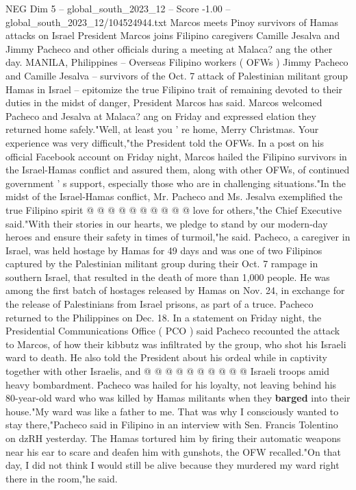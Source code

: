 \begin{textsample}{NEG Dim 5 – global\_south\_2023\_12 – Score -1.00 – global\_south\_2023\_12/104524944.txt}  \label{ex:f5_neg_231}
Marcos meets Pinoy survivors of Hamas attacks on Israel President Marcos joins Filipino caregivers Camille Jesalva and Jimmy Pacheco and other officials during a meeting at Malaca? ang the other day.
MANILA, Philippines -- Overseas Filipino workers ( OFWs ) Jimmy Pacheco and Camille Jesalva -- survivors of the Oct. 7 attack of Palestinian militant group Hamas in Israel -- epitomize the true Filipino trait of remaining devoted to their duties in the midst of danger, President Marcos has said.
Marcos welcomed Pacheco and Jesalva at Malaca? ang on Friday and expressed elation they returned home safely."Well, at least you ' re home, Merry Christmas.
Your experience was very difficult,"the President told the OFWs.
In a post on his official Facebook account on Friday night, Marcos hailed the Filipino survivors in the Israel-Hamas conflict and assured them, along with other OFWs, of continued government ' s support, especially those who are in challenging situations."In the midst of the Israel-Hamas conflict, Mr.
Pacheco and Ms.
Jesalva exemplified the true Filipino spirit @ @ @ @ @ @ @ @ @ @ love for others,"the Chief Executive said."With their stories in our hearts, we pledge to stand by our modern-day heroes and ensure their safety in times of turmoil,"he said.
Pacheco, a caregiver in Israel, was held hostage by Hamas for 49 days and was one of two Filipinos captured by the Palestinian militant group during their Oct. 7 rampage in southern Israel, that resulted in the death of more than 1,000 people.
He was among the first batch of hostages released by Hamas on Nov. 24, in exchange for the release of Palestinians from Israel prisons, as part of a truce.
Pacheco returned to the Philippines on Dec. 18.
In a statement on Friday night, the Presidential Communications Office ( PCO ) said Pacheco recounted the attack to Marcos, of how their kibbutz was infiltrated by the group, who shot his Israeli ward to death.
He also told the President about his ordeal while in captivity together with other Israelis, and @ @ @ @ @ @ @ @ @ @ Israeli troops amid heavy bombardment.
Pacheco was hailed for his loyalty, not leaving behind his 80-year-old ward who was killed by Hamas militants when they \textbf{barged} into their house."My ward was like a father to me.
That was why I consciously wanted to stay there,"Pacheco said in Filipino in an interview with Sen.
Francis Tolentino on dzRH yesterday.
The Hamas tortured him by firing their automatic weapons near his ear to scare and deafen him with gunshots, the OFW recalled."On that day, I did not think I would still be alive because they murdered my ward right there in the room,"he said.

\end{textsample}
